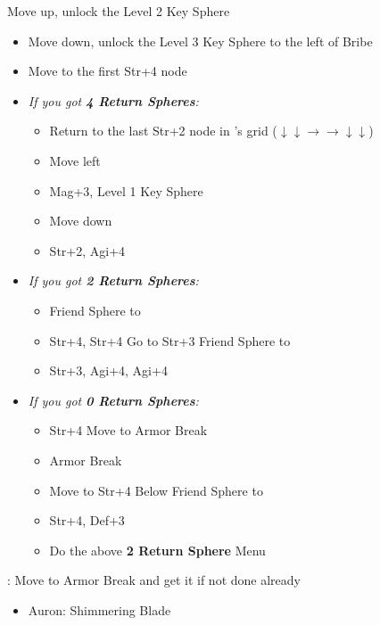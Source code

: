 \begin{spheregrid}
\begin{itemize}
	\luluf Move up, unlock the Level 2 Key Sphere
	\begin{itemize}
		\item Move down, unlock the Level 3 Key Sphere to the left of Bribe
		\item Move to the first Str+4 node
	\end{itemize}
	\yunaf
	\begin{itemize}
		\item \textit{If you got \textbf{4 Return Spheres}:}
		\begin{itemize}
			\item Return to the last Str+2 node in \wakka's grid ($\downarrow \downarrow \rightarrow \rightarrow \downarrow \downarrow$)
			\item Move left
			\item Mag+3, Level 1 Key Sphere
			\item Move down
			\item Str+2, Agi+4
		\end{itemize}
		\item \textit{If you got \textbf{2 Return Spheres}:}
		\begin{itemize}
			\item Friend Sphere to \lulu
			\item Str+4, Str+4
			\luluf Go to Str+3
			\yunaf Friend Sphere to \lulu
			\item Str+3, Agi+4, Agi+4
		\end{itemize}
		\item \textit{If you got \textbf{0 Return Spheres}:}
		\begin{itemize}
			\tidusf Move to Str+4 by Armor Break
			\yunaf Friend Sphere to \tidus
			\item Str+4
			\tidusf Move to Armor Break
			\item Armor Break
			\item Move to Str+4 Below
			\yunaf Friend Sphere to \tidus
			\item Str+4, Def+3
			\item Do the above \textbf{2 Return Sphere} Menu
		\end{itemize}
	\end{itemize}
	\tidusf: Move to Armor Break and get it if not done already
\end{itemize}
\end{spheregrid}
\begin{equip}
\begin{itemize}
	\item Auron: Shimmering Blade
\end{itemize}
\end{equip}
